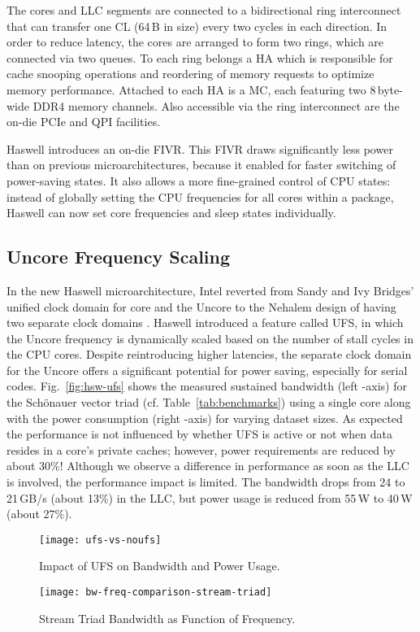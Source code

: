 \documentclass{llncs}
\begin{document}
The cores and \ac{LLC} segments are connected to a bidirectional ring
interconnect that can transfer one \ac{CL} (64\,B in size) every two cycles in
each direction.  In order to reduce latency, the cores are arranged to form two
rings, which are connected via two queues. To each ring belongs a
\ac{HA} which is responsible for cache snooping operations and reordering of
memory requests to optimize memory performance. Attached to each \ac{HA} is a
\ac{MC}, each featuring two 8\,byte-wide DDR4 memory channels.  Also accessible
via the ring interconnect are the on-die PCIe and QPI facilities.

Haswell introduces an on-die \ac{FIVR}. This \ac{FIVR}
draws significantly less power than on previous
microarchitectures, because it enabled for faster switching of
power-saving states. It also allows a more fine-grained control of CPU states:
instead of globally setting the CPU frequencies for all cores within a package,
Haswell can now set core frequencies and sleep states individually.

\subsection{Uncore Frequency Scaling}

In the new Haswell microarchitecture, Intel reverted from Sandy and Ivy
Bridges' unified clock domain for core and the Uncore to the Nehalem design of
having two separate clock domains
\cite{Intel:xeon-e5-v1-overview,Intel:techjournal}.  Haswell introduced a
feature called \ac{UFS}, in which the Uncore frequency is dynamically scaled
based on the number of stall cycles in the CPU cores.  Despite reintroducing
higher latencies, the separate clock domain for the Uncore offers a significant
potential for power saving, especially for serial codes.
Fig.~\ref{fig:hsw-ufs} shows the measured sustained bandwidth (left -axis)
for the Sch\"on\-au\-er vector triad (cf. Table~\ref{tab:benchmarks}) using a
single core along with the power consumption (right -axis) for varying
dataset sizes. As expected the performance is not influenced by whether UFS is
active or not when data resides in a core's private caches; however, power
requirements are reduced by about 30\%!  Although we observe a difference in
performance as soon as the \ac{LLC} is involved, the performance impact is
limited. The bandwidth drops from 24 to 21\,GB/s (about 13\%) in the \ac{LLC},
but power usage is reduced from 55\,W to 40\,W (about 27\%).

\begin{figure}[tb]
\begin{minipage}{.49\textwidth}
    \centering
    \texttt{[image: ufs-vs-noufs]}
    \caption{Impact of \ac{UFS} on Bandwidth and Power Usage.}
    \label{fig:hsw-ufs}
\end{minipage}\hfill
\begin{minipage}{.49\textwidth}
    \centering
    \texttt{[image: bw-freq-comparison-stream-triad]}
    \caption{Stream Triad Bandwidth as Function of Frequency.}
    \label{fig:bw-freq-comparison-stream-triad}
\end{minipage}
\end{figure}
\end{document}
